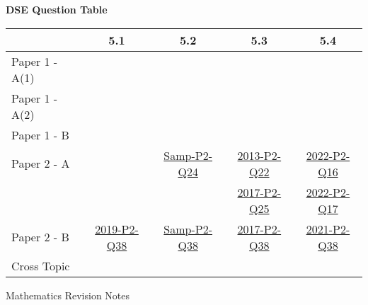 \documentclass[12pt, a4paper]{article}
\begin{document}
\begin{absolutelynopagebreak}
\begin{center}
\textbf{DSE Question Table}
\end{center}
\begin{center}
\begin{tabular}{|l|c|c|c|c|}
\hline
        & 5.1 & 5.2 & 5.3 & 5.4 \\\hline
\hline
Paper 1 - A(1)&  &  &  &  \\
\hline
Paper 1 - A(2)&  &  &  &  \\
\hline
Paper 1 - B&  &  &  &  \\
\hline
\hline
Paper 2 - A&  & \hyperref[DSE2012S-CoreP2-Q24]{Samp-P2-Q24} & \hyperref[DSE2013-CoreP2-Q22]{2013-P2-Q22} & \hyperref[DSE2022-CoreP2-Q16]{2022-P2-Q16} \\
&  &  & \hyperref[DSE2017-CoreP2-Q25]{2017-P2-Q25} & \hyperref[DSE2022-CoreP2-Q17]{2022-P2-Q17} \\
\hline
Paper 2 - B& \hyperref[DSE2019-CoreP2-Q38]{2019-P2-Q38} & \hyperref[DSE2012S-CoreP2-Q38]{Samp-P2-Q38} & \hyperref[DSE2017-CoreP2-Q38]{2017-P2-Q38} & \hyperref[DSE2021-CoreP2-Q38]{2021-P2-Q38} \\
\hline
\hline
Cross Topic&  &  &  &  \\
\hline
\end{tabular}
\end{center}
\end{absolutelynopagebreak}
\newpage
\newpage
\thispagestyle{empty}
\begin{center}
Mathematics Revision Notes\\\vspace{1cm}
\\\vspace{1cm}
{\fontsize{24pt}{24pt}\selectfont {Applications of Trigonometry in 3-D problems \NF}} \\\vspace{1cm}
\label{chapter:S5-6}

\end{center}
\vspace{0.5cm}
\hline
\end{document}
